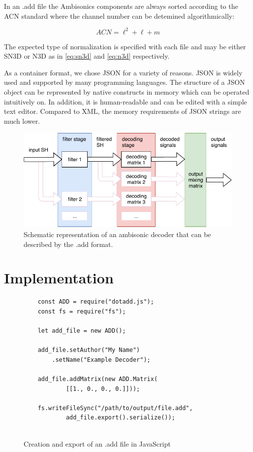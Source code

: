 \documentclass[a4paper, 10pt, twocolumn]{article}
\begin{document}
In an .add file the Ambisonics components are always sorted according to the ACN standard where the channel number can be detemined algorithmically:

\begin{equation}
    ACN=\ell^{2}+\ell+m
\end{equation}

The expected type of normalization is specified with each file and may be either SN3D or N3D as in \eqref{eq:sn3d} and \eqref{eq:n3d} respectively.

As a container format, we chose JSON for a variety of reasons. JSON is widely used and supported by many programming languages. The structure of a JSON object can be represented by native constructs in memory which can be operated intuitively on. In addition, it is human-readable and can be edited with a simple text editor. Compared to XML, the memory requirements of JSON strings are much lower.

\vspace{2mm}
\begin{figure}[htb]
\includegraphics[width=\the\linewidth]{decoding.pdf}
\caption{Schematic representation of an ambisonic decoder that can be described by the .add format.}
\end{figure}
\vspace{2mm}

\section{Implementation} \label{sec:Implementation}

\vspace{3mm}
\begin{figure}[htb]
\begin{lstlisting}
    const ADD = require("dotadd.js");
    const fs = require("fs");
    
    let add_file = new ADD();
    
    add_file.setAuthor("My Name")
        .setName("Example Decoder");
    
    add_file.addMatrix(new ADD.Matrix(
            [[1., 0., 0., 0.]]));
    
    fs.writeFileSync("/path/to/output/file.add", 
            add_file.export().serialize());
    
    \end{lstlisting}
\caption{Creation and export of an .add file in JavaScript}\label{fig:dotadd}
\end{figure}
\vspace{2mm}
\end{document}
